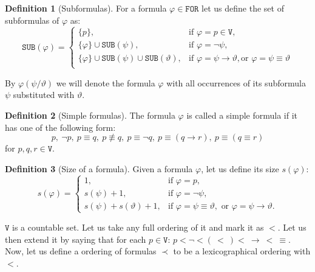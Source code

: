 \documentclass{article}
\theoremstyle{definition}
\newtheorem{definition}{Definition}[section]
\theoremstyle{definition}
\newcommand*{\id}{\equiv}
\newcommand*{\ra}{\rightarrow}
\newcommand*{\V}{\texttt{V}}
\newcommand*{\FOR}{\texttt{FOR}}
\newcommand*{\SUB}{\texttt{SUB}}
\begin{document}
\begin{definition}[Subformulas]
    For a formula $\varphi \in \FOR$ let us define the set of subformulas of $\varphi$ as:
    $$
        \SUB(\varphi) = \begin{cases}
            \{p\},                                            & \text{if } \varphi = p \in \V,                                                   \\
            \{\varphi\} \cup \SUB(\psi),                      & \text{if } \varphi = \lnot \psi,                                                 \\
            \{\varphi\} \cup \SUB(\psi) \cup \SUB(\vartheta), & \text{if } \varphi = \psi \ra \vartheta, \text{or } \varphi = \psi \id \vartheta \\
        \end{cases}
    $$
\end{definition}
By $\varphi(\psi / \vartheta)$ we will denote the formula $\varphi$ with all
occurrences of its subformula $\psi$ substituted with $\vartheta$.

\begin{definition}[Simple formulas]
    The formula $\varphi$ is called a simple formula if it has one of the following form:
    $$
        p,\ \lnot p,\ p \id q,\ p \not \id q,\ p \id \lnot q,\ p \id (q \ra r),\ p \id (q \id r)
    $$
    for $p, q, r \in \V$.
\end{definition}

\begin{definition}[Size of a formula]
    Given a formula $\varphi$, let us define its size $s(\varphi)$:
    $$
        s(\varphi) = \begin{cases}
            1,                          & \text{if } \varphi = p,                                                                      \\
            s(\psi) + 1,                & \text{if } \varphi = \lnot \psi,                                                             \\
            s(\psi) + s(\vartheta) + 1, & \text{if } \varphi = \psi \equiv \vartheta,\text{ or } \varphi = \psi \rightarrow \vartheta.
        \end{cases}
    $$
\end{definition}
$\V$ is a countable set. Let us take any full ordering of it and mark it as $<$. Let us then
extend it by saying that for each $p \in \V$: $p < \lnot <\xspace (\ < \ )\xspace<\ \ra\ <\ \id$. Now,
let us define a ordering of formulas $\prec$ to be a lexicographical ordering
with $<$.
\end{document}
